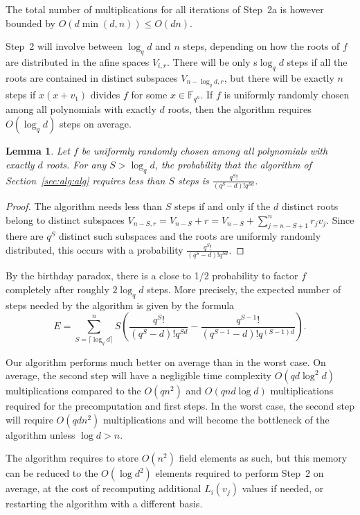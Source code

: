 \documentclass{sig-alternate}
\newcommand{\ff}[1]{\mathbb{F}_{#1}}
\newcommand{\fqn}{\ff{q^n}}
\newcounter{algo}
\newtheorem{Lem}{Lemma}
\begin{document}
The total number of multiplications for all iterations of Step~2a is however bounded by $O(d\min(d,n))\leq O(dn)$.

Step~2 will involve between $\log_qd$ and $n$ steps, depending on how the roots of $f$ are distributed in the afine spaces $V_{i,r}$. There will be only s$\log_qd$ steps if all the roots are contained in distinct subspaces $V_{n-\log_qd,r}$, but there will be exactly $n$ steps if $x(x+v_1)$ divides $f$ for some $x\in\fqn$. 
%
If $f$ is uniformly randomly chosen among all polynomials with exactly $d$ roots, then the algorithm requires $O(\log_qd)$ steps on average.


\begin{Lem}
Let $f$ be uniformly randomly chosen among all polynomials with exactly $d$ roots. For any $S>\log_qd$, the probability that the algorithm of Section~\ref{sec:alg:alg} requires less than $S$ steps is $\frac{q^S!}{(q^S-d)!q^{Sd}}$. 
\end{Lem}
\begin{proof}
The algorithm needs less than $S$ steps if and only if the $d$ distinct roots belong to distinct subspaces $V_{n-S,r}=V_{n-S}+r=V_{n-S}+\sum_{j=n-S+1}^nr_jv_j$. Since there are $q^S$ distinct such subspaces and the roots are uniformly randomly distributed, this occurs with a probability $\frac{q^S!}{(q^S-d)!q^{Sd}}$.
\end{proof}
%
\noindent By the birthday paradox, there is a close to 1/2 probability to factor $f$ completely after roughly $2\log_qd$ steps. More precisely, the expected number of steps needed by the algorithm is given by the formula
$$E=\sum_{S=\lceil\log_qd\rceil}^nS\left(\frac{q^S!}{(q^S-d)!q^{Sd}}-\frac{q^{S-1}!}{(q^{S-1}-d)!q^{(S-1)d}}\right).$$

Our algorithm performs much better on average than in the worst case. On average, the second step will have a negligible time complexity $O(qd\log^2d)$ multiplications compared to the $O(qn^2)$ and $O(qnd\log d)$ multiplications required for the precomputation and first steps.
%
In the worst case, the second step will require $O(qdn^2)$ multiplications and will become the bottleneck of the algorithm unless $\log d>n$.

The algorithm requires to store $O(n^2)$ field elements as such, but this memory can be reduced to the $O(\log d^2)$ elements required to perform Step~2 on average, at the cost of recomputing additional $L_i(v_j)$ values if needed, or restarting the algorithm with a different basis. 
\end{document}

